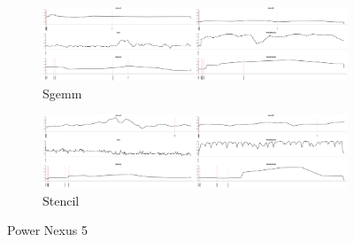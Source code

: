 \begin{figure}[ht]
  \begin{subfigure}[b]{0.95\textwidth}
      \centering
      \includegraphics[width=\textwidth]{data/power_sgemm_nexus5.pdf}
      \caption{Sgemm}\label{fig:Sgemm}
  \end{subfigure}
  \begin{subfigure}[b]{0.95\textwidth}
      \centering
      \includegraphics[width=\textwidth]{data/power_stencil_nexus5.pdf}
      \caption{Stencil}
      \label{fig:Stencil}
  \end{subfigure}

  \caption{Power Nexus 5}
\end{figure}


